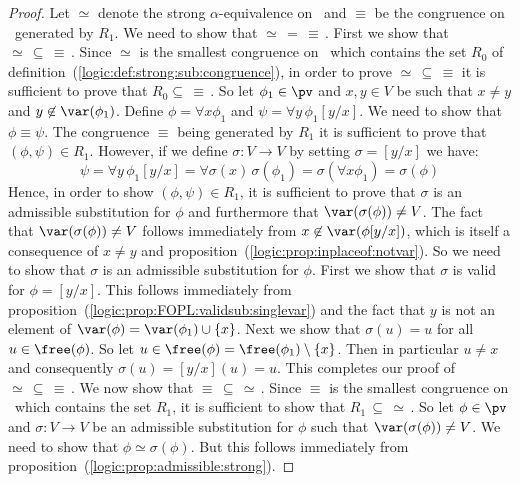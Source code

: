 \noindent
\begin{proof}
Let $\simeq$ denote the strong $\alpha$-equivalence on \pv\ and
$\equiv$ be the congruence on \pv\ generated by $R_{1}$. We need to
show that $\simeq\,=\,\equiv\,$. First we show that
$\simeq\,\subseteq\,\equiv\,$. Since $\simeq$ is the smallest
congruence on \pv\ which contains the set $R_{0}$ of
definition~(\ref{logic:def:strong:sub:congruence}), in order to
prove $\simeq\,\subseteq\,\equiv$ it is sufficient to prove that
$R_{0}\subseteq\,\equiv\,$. So let $\phi_{1}\in\pv$ and $x,y\in V$
be such that $x\neq y$ and $y\not\in\var(\phi_{1})$. Define
$\phi=\forall x\phi_{1}$ and $\psi=\forall y\,\phi_{1}[y/x]$. We
need to show that $\phi\equiv\psi$. The congruence $\equiv$ being
generated by $R_{1}$ it is sufficient to prove that $(\phi,\psi)\in
R_{1}$. However, if we define $\sigma:V\to V$ by setting
$\sigma=[y/x]$ we have:
    \[
    \psi=\forall
    y\,\phi_{1}[y/x]=\forall\sigma(x)\,\sigma(\phi_{1})=\sigma(\forall
    x\phi_{1})=\sigma(\phi)
    \]
Hence, in order to show $(\phi,\psi)\in R_{1}$, it is sufficient to
prove that $\sigma$ is an admissible substitution for $\phi$ and
furthermore that $\var(\sigma(\phi))\neq V$. The fact that
$\var(\sigma(\phi))\neq V$ follows immediately from
$x\not\in\var(\phi[y/x])$, which is itself a consequence of $x\neq
y$ and proposition~(\ref{logic:prop:inplaceof:notvar}). So we need
to show that $\sigma$ is an admissible substitution for $\phi$.
First we show that $\sigma$ is valid for $\phi=[y/x]$. This follows
immediately from
proposition~(\ref{logic:prop:FOPL:validsub:singlevar}) and the fact
that $y$ is not an element of $\var(\phi)=\var(\phi_{1})\cup\{x\}$.
Next we show that $\sigma(u)=u$ for all $u\in\free(\phi)$. So let
$u\in\free(\phi)=\free(\phi_{1})\setminus\{x\}$. Then in particular
$u\neq x$ and consequently $\sigma(u)=[y/x](u)=u$. This completes
our proof of $\simeq\,\subseteq\,\equiv\,$. We now show that
$\equiv\,\subseteq\,\simeq\,$. Since $\equiv$ is the smallest
congruence on \pv\ which contains the set $R_{1}$, it is sufficient
to show that $R_{1}\,\subseteq\,\simeq\,$. So let $\phi\in\pv$ and
$\sigma:V\to V$ be an admissible substitution for $\phi$ such that
$\var(\sigma(\phi))\neq V$. We need to show that
$\phi\simeq\sigma(\phi)$. But this follows immediately from
proposition~(\ref{logic:prop:admissible:strong}).
\end{proof}

